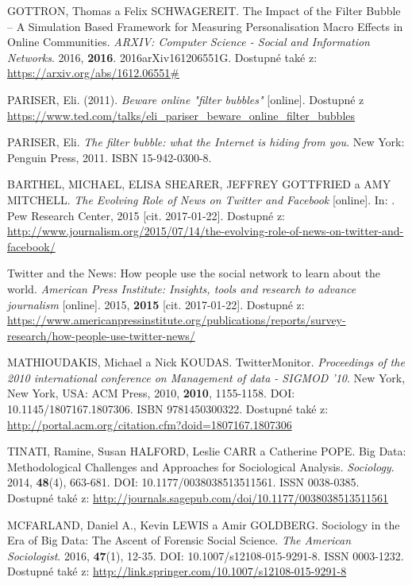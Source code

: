 \documentclass[12pt, a4paper]{article}
\numberwithin{equation}{section} 	%
\begin{document}
\begin{thebibliography}{99}
    GOTTRON, Thomas a Felix SCHWAGEREIT. The Impact of the Filter Bubble -- A Simulation Based Framework for Measuring Personalisation Macro Effects in Online Communities. \textit{ARXIV: Computer Science - Social and Information Networks}. 2016, \textbf{2016}. 2016arXiv161206551G. Dostupné také z: \url{https://arxiv.org/abs/1612.06551\#}

    PARISER, Eli. (2011). \textit{Beware online "filter bubbles"} [online]. Dostupné z \url{https://www.ted.com/talks/eli_pariser_beware_online_filter_bubbles}

    PARISER, Eli. \textit{The filter bubble: what the Internet is hiding from you}. New York: Penguin Press, 2011. ISBN 15-942-0300-8.

    BARTHEL, MICHAEL, ELISA SHEARER, JEFFREY GOTTFRIED a AMY MITCHELL. \textit{The Evolving Role of News on Twitter and Facebook} [online]. In: . Pew Research Center, 2015 [cit. 2017-01-22]. Dostupné z: \url{http://www.journalism.org/2015/07/14/the-evolving-role-of-news-on-twitter-and-facebook/}

    Twitter and the News: How people use the social network to learn about the world. \textit{American Press Institute: Insights, tools and research to advance journalism} [online]. 2015, \textbf{2015} [cit. 2017-01-22]. Dostupné z: \url{https://www.americanpressinstitute.org/publications/reports/survey-research/how-people-use-twitter-news/}

    MATHIOUDAKIS, Michael a Nick KOUDAS. TwitterMonitor. \textit{Proceedings of the 2010 international conference on Management of data - SIGMOD '10}. New York, New York, USA: ACM Press, 2010, \textbf{2010}, 1155-1158. DOI: 10.1145/1807167.1807306. ISBN 9781450300322. Dostupné také z: \url{http://portal.acm.org/citation.cfm?doid=1807167.1807306}

    TINATI, Ramine, Susan HALFORD, Leslie CARR a Catherine POPE. Big Data: Methodological Challenges and Approaches for Sociological Analysis. \textit{Sociology}. 2014, \textbf{48}(4), 663-681. DOI: 10.1177/0038038513511561. ISSN 0038-0385. Dostupné také z: \url{http://journals.sagepub.com/doi/10.1177/0038038513511561}

    MCFARLAND, Daniel A., Kevin LEWIS a Amir GOLDBERG. Sociology in the Era of Big Data: The Ascent of Forensic Social Science. \textit{The American Sociologist}. 2016, \textbf{47}(1), 12-35. DOI: 10.1007/s12108-015-9291-8. ISSN 0003-1232. Dostupné také z: \url{http://link.springer.com/10.1007/s12108-015-9291-8}


\end{thebibliography}
\end{document}
